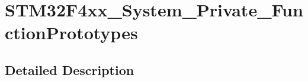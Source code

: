 \hypertarget{group___s_t_m32_f4xx___system___private___function_prototypes}{\section{S\-T\-M32\-F4xx\-\_\-\-System\-\_\-\-Private\-\_\-\-Function\-Prototypes}
\label{group___s_t_m32_f4xx___system___private___function_prototypes}
}


\subsection{Detailed Description}

